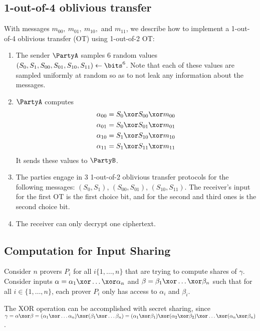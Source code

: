 \subsection{1-out-of-4 oblivious transfer}
  With messages $m_{00},\ m_{01},\ m_{10},$ and $m_{11}$, we describe how to implement a 1-out-of-4 oblivious transfer (OT) using 1-out-of-2 OT:\@
  \begin{enumerate}
    \item
      The sender $\PartyA$ samples 6 random values $(S_0, S_1, S_{00}, S_{01}, S_{10}, S_{11}) \gets \bits^6$. Note that each of these values are sampled uniformly at random so as to not leak any information about the messages.
    \item
      $\PartyA$ computes
      \begin{align*}
        \alpha_{00} &= S_0 \xor S_{00} \xor m_{00}\\
        \alpha_{01} &= S_0 \xor S_{01} \xor m_{01}\\
        \alpha_{10} &= S_1 \xor S_{10} \xor m_{10}\\
        \alpha_{11} &= S_1 \xor S_{11} \xor m_{11}
      \end{align*}
      It sends these values to $\PartyB$.
    \item
      The parties engage in 3 1-out-of-2 oblivious transfer protocols for the following
      messages: $(S_0, S_1)$, $(S_{00}, S_{01})$, $(S_{10}, S_{11})$. The receiver's input for the first OT is the first choice bit, and for the second and third ones is
      the second choice bit.
    \item
      The receiver can only decrypt one ciphertext.
  \end{enumerate}

\subsection{Computation for Input Sharing}
Consider $n$ provers $P_i$ for all $i \{1, \dots, n\}$ that are trying to compute shares of $\gamma$. Consider inputs $\alpha = \alpha_1 \xor \dots \xor \alpha_n$ and $\beta = \beta_1 \xor \dots \xor \beta_n$ such that for all $i \in \{1, \dots, n\}$, each prover $P_i$ only has access to $\alpha_i$ and $\beta_i$.

The XOR operation can be accomplished with secret sharing, since $\gamma = \alpha \xor \beta = (\alpha_1 \xor \dots \alpha_n) \xor (\beta_1 \xor \dots \beta_n) = (\alpha_1 \xor \beta_1) \xor (\alpha_2 \xor \beta_2) \xor \dots \xor (\alpha_n \xor \beta_n)$.


